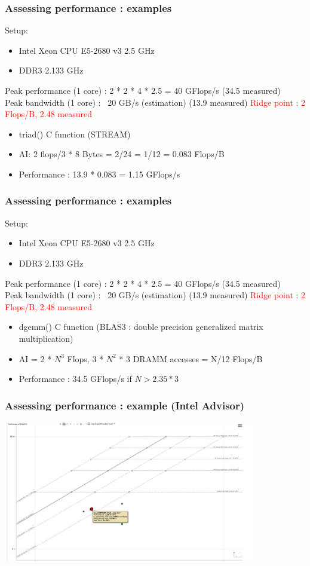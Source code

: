 \begin{frame}[containsverbatim]
\frametitle{Assessing performance : examples}
Setup:
\begin{itemize}
\item Intel Xeon CPU E5-2680 v3 2.5 GHz
\item DDR3 2.133 GHz
\end{itemize}
Peak performance (1 core) : 2 * 2 * 4 * 2.5 = 40 GFlops/s (34.5 measured)
\\
Peak bandwidth (1 core) : ~20 GB/s (estimation) (13.9 measured)
\vfill
\textcolor{red}{Ridge point : 2 Flops/B, 2.48 measured}
\vfill
\begin{itemize}
\item triad() C function (STREAM)
\item AI: 2 flops/3 * 8 Bytes = 2/24 = 1/12 = 0.083 Flops/B
\item Performance : 13.9 * 0.083 = 1.15 GFlops/s
\end{itemize}
\end{frame}


\begin{frame}[containsverbatim]
\frametitle{Assessing performance : examples}
Setup:
\begin{itemize}
\item Intel Xeon CPU E5-2680 v3 2.5 GHz
\item DDR3 2.133 GHz
\end{itemize}
Peak performance (1 core) : 2 * 2 * 4 * 2.5 = 40 GFlops/s (34.5 measured)
\\
Peak bandwidth (1 core) : ~20 GB/s (estimation) (13.9 measured)
\vfill
\textcolor{red}{Ridge point : 2 Flops/B, 2.48 measured}
\vfill
\begin{itemize}
\item dgemm() C function (BLAS3 : double precision generalized matrix multiplication)
\item AI = 2 * $N^3$ Flops, 3 * $N^2$ * 3 DRAMM accesses = N/12 Flops/B
\item Performance : 34.5 GFlops/s if $N > 2.35 * 3$
\end{itemize}
\end{frame}



\begin{frame}[containsverbatim]
\frametitle{Assessing performance : example (Intel Advisor)}
\begin{center}
\includegraphics[width=11cm]{DayGilles/images/advisor1.jpg}
\end{center}
\end{frame}



